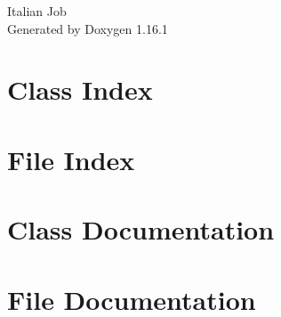 \documentclass[twoside]{book}
\newcommand{\+}{\discretionary{\mbox{\scriptsize$\hookleftarrow$}}{}{}}
\newcommand{\clearemptydoublepage}{%
    \newpage{\pagestyle{empty}\cleardoublepage}%
  }
\begin{document}
  \raggedbottom
    \hypersetup{pageanchor=false,
                bookmarksnumbered=true,
                pdfencoding=unicode
               }
  \begin{titlepage}
  \vspace*{7cm}
  \begin{center}%
  {\Large Italian Job}\\
  \vspace*{1cm}
  {\large Generated by Doxygen 1.16.1}\\
  \end{center}
  \end{titlepage}
  \clearemptydoublepage
  \tableofcontents
  \clearemptydoublepage
  \hypersetup{pageanchor=true}

\chapter{Class Index}

\chapter{File Index}

\chapter{Class Documentation}








\chapter{File Documentation}

































  \backmatter
  \newpage
  \clearemptydoublepage
  \printindex
\end{document}
